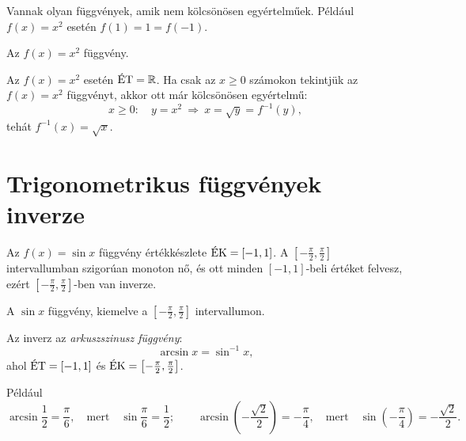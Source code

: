 \documentclass[11pt]{article}
\begin{document}
Vannak olyan függvények, amik nem kölcsönösen egyértelműek. Például $f(x)=x^{2}$ esetén $f(1)=1=f(-1)$.

\begin{notefig}{Az $f(x)=x^{2}$ függvény.}
\end{notefig}

\noindent Az $f(x)=x^{2}$ esetén $\ET=\R$. Ha csak az $x\ge 0$ számokon tekintjük az $f(x)=x^{2}$ függvényt, akkor ott már kölcsönösen egyértelmű:
\[
x\ge 0:\quad y=x^{2}\ \Longrightarrow\ x=\sqrt{y}=f^{-1}(y),
\]
tehát $f^{-1}(x)=\sqrt{x}$.

\section{Trigonometrikus függvények inverze}

Az $f(x)=\sin x$ függvény értékkészlete $\EK=[-1, 1]$. A $\left[-\frac{\pi}{2}, \frac{\pi}{2}\right]$ intervallumban szigorúan monoton nő, és ott minden $[-1, 1]$-beli értéket felvesz, ezért $\left[-\frac{\pi}{2}, \frac{\pi}{2}\right]$-ben van inverze.

\begin{notefig}{A $\sin x$ függvény, kiemelve a $\left[-\frac{\pi}{2}, \frac{\pi}{2}\right]$ intervallumon.}
\end{notefig}

\begin{defbox}
\begin{definition}
Az inverz az \emph{arkuszszinusz függvény}:
\[
\arcsin x=\sin^{-1}x,
\]
ahol $\ET=[-1, 1]$ és $\EK=\left[-\frac{\pi}{2}, \frac{\pi}{2}\right]$.
\end{definition}
\end{defbox}
Például
\[
\arcsin\frac{1}{2}=\frac{\pi}{6},\quad\text{mert}\quad \sin\frac{\pi}{6}=\frac{1}{2};\qquad
\arcsin\left(-\frac{\sqrt{2}}{2}\right)=-\frac{\pi}{4},\quad\text{mert}\quad \sin\left(-\frac{\pi}{4}\right)=-\frac{\sqrt{2}}{2}.
\]
\end{document}
